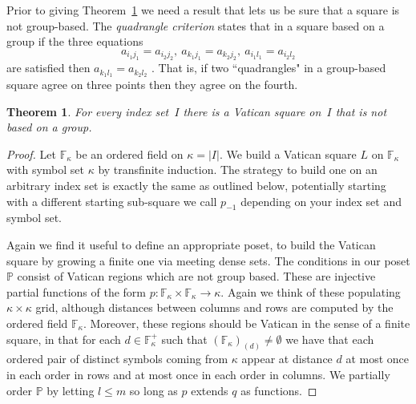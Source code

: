 \documentclass[12pt,a4paper]{article}
\newtheorem{thm}{Theorem}[section]
\newcommand{\F}{\mathbb{F}}
\newcommand{\To}{\longrightarrow}
\renewcommand{\P}{\mathbb{P}}
\begin{document}
Prior to giving Theorem~\ref{th:infvat} we need a result that lets us be sure that a square is not group-based.  The {\em quadrangle criterion} states that in a square based on a group if the three equations
$$a_{i_1j_1} = a_{i_2j_2}, \ a_{k_1j_1} = a_{k_2j_2}, \ a_{i_1l_1} = a_{i_2l_2}$$
are satisfied then $a_{k_1l_1} = a_{k_2l_2}$ \cite[Theorem~1.2.1]{DK15}.  That is, if two ``quadrangles" in a group-based square agree on three points then they agree on the fourth.


\begin{thm}\label{th:infvat}
For every index set~$I$ %
there is a Vatican square on~$I$ that is not based on a  group.
\end{thm}

\begin{proof}
Let $\F_\kappa$ be an ordered field on $\kappa=|I|$.
We build a Vatican square $L$ on $\F_\kappa$ with symbol set $\kappa$ by transfinite induction. The strategy to build one on an arbitrary index set is exactly the same as outlined below, potentially starting with a different starting sub-square we call $p_{-1}$ depending on your index set and symbol set.

Again we find it useful to define an appropriate poset, to build the Vatican square by growing a finite one via meeting dense sets. The conditions in our poset $\P$ consist of Vatican regions which are not group based. These are injective partial functions of the form $p:\F_\kappa \times \F_\kappa\To\kappa$. Again we think of these populating $\kappa\times\kappa$ grid, although distances between columns and rows are computed by the ordered field $\F_\kappa$. Moreover, these regions should be Vatican in the sense of a finite square, in that for each $d\in \F_\kappa^+$ such that ${(\F_\kappa)}_{(d)}\neq\emptyset$ we have that each ordered pair of distinct symbols coming from $\kappa$ appear at distance $d$ at most once in each order in rows and at most once in each order in columns. We partially order $\P$ by letting $l \leq m$ so long as $p$ extends $q$ as functions.


\end{proof}
\end{document}
